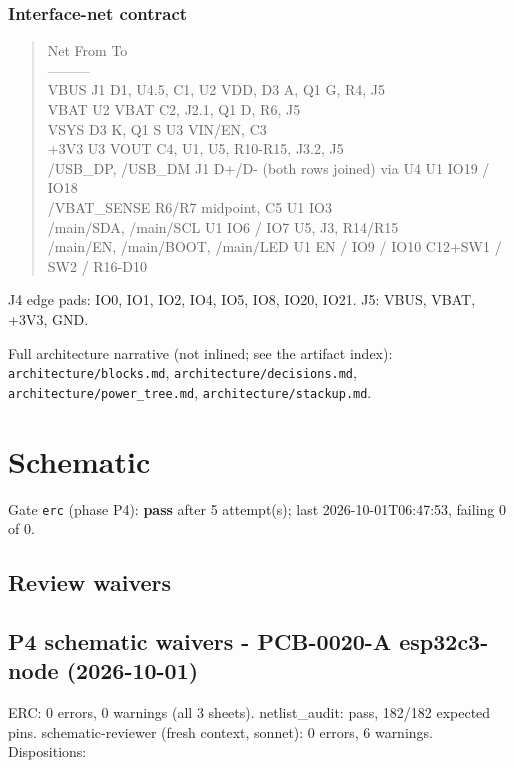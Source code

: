 \documentclass[11pt]{article}
\begin{document}
\subsubsection*{Interface-net contract}
\begin{quote}\small\ttfamily\raggedright
\textbar{} Net \textbar{} From \textbar{} To \textbar{}\\
\textbar{}---\textbar{}---\textbar{}---\textbar{}\\
\textbar{} VBUS \textbar{} J1 \textbar{} D1, U4.5, C1, U2 VDD, D3 A, Q1 G, R4, J5 \textbar{}\\
\textbar{} VBAT \textbar{} U2 VBAT \textbar{} C2, J2.1, Q1 D, R6, J5 \textbar{}\\
\textbar{} VSYS \textbar{} D3 K, Q1 S \textbar{} U3 VIN/EN, C3 \textbar{}\\
\textbar{} +3V3 \textbar{} U3 VOUT \textbar{} C4, U1, U5, R10-R15, J3.2, J5 \textbar{}\\
\textbar{} /USB\_DP, /USB\_DM \textbar{} J1 D+/D- (both rows joined) via U4 \textbar{} U1 IO19 / IO18 \textbar{}\\
\textbar{} /VBAT\_SENSE \textbar{} R6/R7 midpoint, C5 \textbar{} U1 IO3 \textbar{}\\
\textbar{} /main/SDA, /main/SCL \textbar{} U1 IO6 / IO7 \textbar{} U5, J3, R14/R15 \textbar{}\\
\textbar{} /main/EN, /main/BOOT, /main/LED \textbar{} U1 EN / IO9 / IO10 \textbar{} C12+SW1 / SW2 / R16-D10 \textbar{}
\end{quote}
J4 edge pads: IO0, IO1, IO2, IO4, IO5, IO8, IO20, IO21. J5: VBUS, VBAT, +3V3, GND.

Full architecture narrative (not inlined; see the artifact index): \texttt{architecture/blocks.md}, \texttt{architecture/decisions.md}, \texttt{architecture/power\_tree.md}, \texttt{architecture/stackup.md}.
\section{Schematic}
Gate \texttt{erc} (phase P4): \textbf{pass} after 5 attempt(s); last 2026-10-01T06:47:53, failing 0 of 0.
\subsection*{Review waivers}
\subsection*{P4 schematic waivers - PCB-0020-A esp32c3-node (2026-10-01)}
ERC: 0 errors, 0 warnings (all 3 sheets). netlist\_audit: pass, 182/182 expected pins. schematic-reviewer (fresh context, sonnet): 0 errors, 6 warnings. Dispositions:
\end{document}
